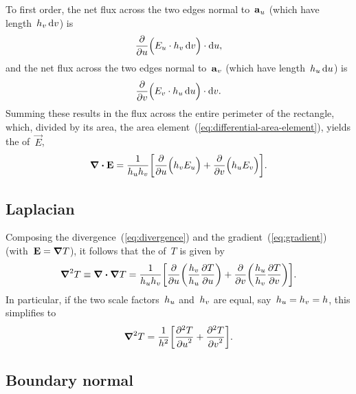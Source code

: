 To first order,
the net flux across the two edges normal to~$\mathop{}\!\boldsymbol{\mathrm{a}}_{u}$
(which have length~$\scalefac[v] \td v$) is
\[
  \pder{}{u} \roundbr[\Big]{
    \comp{E}{u} \cdot \scalefac[v] \td v
  } \cdot \td u,
\]
and the net flux across the two edges normal to~$\mathop{}\!\boldsymbol{\mathrm{a}}_{v}$
(which have length~$\scalefac[u] \td u$) is
\[
  \pder{}{v} \roundbr[\Big]{
    \comp{E}{v} \cdot \scalefac[u] \td u
  } \cdot \td v.
\]
Summing these results in the flux across the entire perimeter of the rectangle,
which, divided by its area,
the area element~(\ref{eq:differential-area-element}),
yields the  of~$\vec{E}$,
\begin{equation}
  \del \dotp \vec{E} =
    \frac{1}{\scalefac[u] \scalefac[v]}
    \squarebr*{
      \pder{}{u} \roundbr[\Big]{\scalefac[v] \comp{E}{u}}
        +
      \pder{}{v} \roundbr[\Big]{\scalefac[u] \comp{E}{v}}
    }.
  \label{eq:divergence}
\end{equation}

\subsection{Laplacian}
\label{sec:curvilinear.calculus.laplacian}

Composing the divergence~(\ref{eq:divergence})
and the gradient~(\ref{eq:gradient}) (with~$\boldsymbol{\mathrm{E}} = \mathop{}\!\boldsymbol{\mathrm{\nabla}} T$),
it follows that the  of~$T$ is given by
\begin{equation}
  \del^2 T \defeq \del \dotp \del T =
    \frac{1}{\scalefac[u] \scalefac[v]}
    \squarebr*{
      \pder{}{u} \roundbr*{\frac{\scalefac[v]}{\scalefac[u]} \pder{T}{u}}
        +
      \pder{}{v} \roundbr*{\frac{\scalefac[u]}{\scalefac[v]} \pder{T}{v}}
    }.
  \label{eq:laplacian}
\end{equation}
In particular,
if the two scale factors~$\scalefac[u]$ and~$\scalefac[v]$ are equal,
say~$\scalefac[u] = \scalefac[v] = \scalefac$,
this simplifies to
\begin{equation}
  \del^2 T =
    \frac{1}{\scalefac^2}
    \squarebr*{\pder[2]{T}{u} + \pder[2]{T}{v}}.
  \label{eq:laplacian-scale-factors-equal}
\end{equation}

\subsection{Boundary normal}
\label{sec:curvilinear.calculus.normal}

